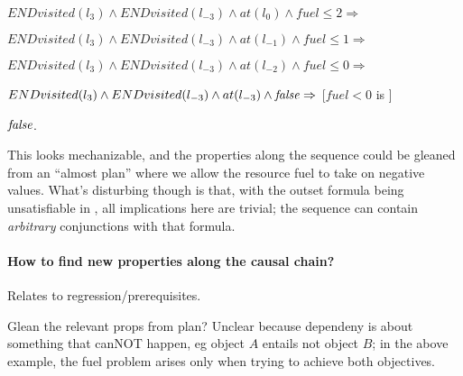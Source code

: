 $END visited(l_{3}) \wedge END visited(l_{-3}) \wedge at(l_{0})
\wedge fuel \leq 2 \Rightarrow$

$END visited(l_{3}) \wedge END visited(l_{-3}) \wedge at(l_{-1})
\wedge fuel \leq 1 \Rightarrow$

$END visited(l_{3}) \wedge END visited(l_{-3}) \wedge at(l_{-2})
\wedge fuel \leq 0 \Rightarrow$

$END visited(l_{3}) \wedge END visited(l_{-3}) \wedge at(l_{-3})
\wedge \mathit{false} \Rightarrow$ [$fuel < 0$ is \false]

$\mathit{false}$.

This looks mechanizable, and the properties along the sequence could
be gleaned from an ``almost plan'' where we allow the resource fuel to
take on negative values. What's disturbing though is that, with the
outset formula being unsatisfiable in \plans, all implications here
are trivial; the sequence can contain \emph{arbitrary} conjunctions
with that formula.





%
%



\paragraph{How to find new properties along the causal chain?}

Relates to regression/prerequisites.

Glean the relevant props from plan? Unclear because dependeny is about
something that canNOT happen, eg object $A$ entails not object $B$; in
the above example, the fuel problem arises only when trying to achieve
both objectives.

